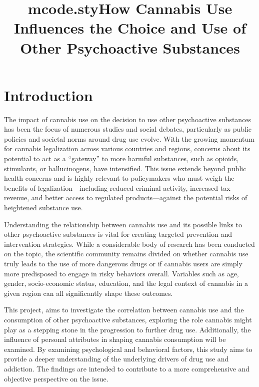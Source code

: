 \documentclass{article}
\title{mcode.sty}
\begin{document}



\stronatytulowa{}
\newpage
\renewcommand*\contentsname{Table of Contents}
\tableofcontents{}

\newpage


\title{How Cannabis Use Influences the Choice and Use of Other Psychoactive Substances}


\section{Introduction}
\hspace{1cm}The impact of cannabis use on the decision to use other psychoactive substances has been the focus of numerous studies and social debates, particularly as public policies and societal norms around drug use evolve. With the growing momentum for cannabis legalization across various countries and regions, concerns about its potential to act as a ``gateway'' to more harmful substances, such as opioids, stimulants, or hallucinogens, have intensified. This issue extends beyond public health concerns and is highly relevant to policymakers who must weigh the benefits of legalization—including reduced criminal activity, increased tax revenue, and better access to regulated products—against the potential risks of heightened substance use.

\hspace{1cm}Understanding the relationship between cannabis use and its possible links to other psychoactive substances is vital for creating targeted prevention and intervention strategies. While a considerable body of research has been conducted on the topic, the scientific community remains divided on whether cannabis use truly leads to the use of more dangerous drugs or if cannabis users are simply more predisposed to engage in risky behaviors overall. Variables such as age, gender, socio-economic status, education, and the legal context of cannabis in a given region can all significantly shape these outcomes.

\hspace{1cm}This project, aims to investigate the correlation between cannabis use and the consumption of other psychoactive substances, exploring the role cannabis might play as a stepping stone in the progression to further drug use. Additionally, the influence of personal attributes in shaping cannabis consumption will be examined. By examining psychological and behavioral factors, this study aims to provide a deeper understanding of the underlying drivers of drug use and addiction. The findings are intended to contribute to a more comprehensive and objective perspective on the issue.
\end{document}
